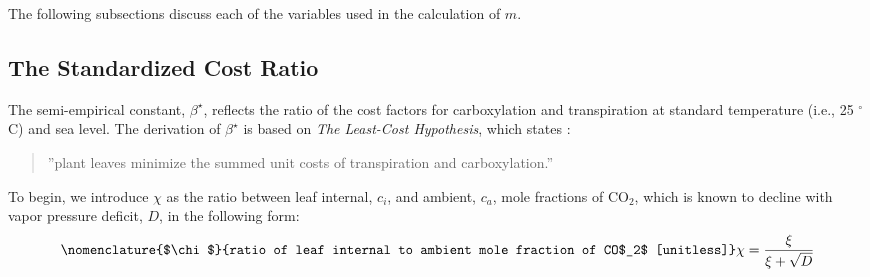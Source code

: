 \noindent The following subsections discuss each of the variables used in the calculation of $m$.

\subsection{The Standardized Cost Ratio}
\label{sec:beta}
%
The semi-empirical constant, $\beta^\star$, reflects the ratio of the cost factors for carboxylation and transpiration at standard temperature (i.e., 25 ${}^\circ$C) and sea level. 
The derivation of $\beta^\star$ is based on \emph{The Least-Cost Hypothesis}, which states \parencite{prentice14}:
\begin{quote}
	''plant leaves minimize the summed unit costs of transpiration and carboxylation.''
\end{quote}
To begin, we introduce $\chi$ as the ratio between leaf internal, $c_i$, and ambient, $c_a$, mole fractions of CO$_2$, which is known to decline with vapor pressure deficit, $D$, in the following form:
\begin{equation}
\nomenclature{$\chi$}{ratio of leaf internal to ambient mole fraction of CO$_2$ [unitless]}%
\label{eq:chi}
    \chi = \frac{\xi}{\xi + \sqrt{D}}
\end{equation}

